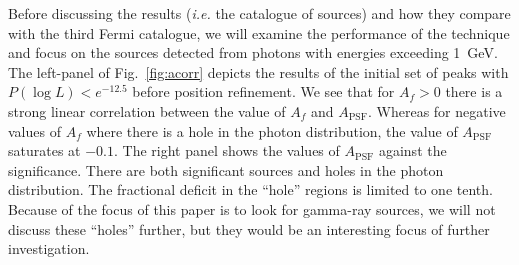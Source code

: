 \documentclass[useAMS,usenatbib]{mn2e}
\begin{document}
Before discussing the results ({\em i.e.} the catalogue of sources) and
how they compare with the third Fermi catalogue, we will examine the
performance of the technique and focus on the sources detected from
photons with energies exceeding 1~GeV.  The left-panel of
Fig.~\ref{fig:acorr} depicts the results of the initial set of peaks
with $P(\log L)<e^{-12.5}$ before position refinement.  We see that
for $A_f>0$ there is a strong linear correlation between the value of
$A_f$ and $A_\mathrm{PSF}$.  Whereas for negative values of $A_f$
where there is a hole in the photon distribution, the value of
$A_\mathrm{PSF}$ saturates at $-0.1$. The right panel shows the values
of $A_\mathrm{PSF}$ against the significance.  There are both
significant sources and holes in the photon distribution.  The
fractional deficit in the ``hole'' regions is limited to one tenth.
Because of the focus of this paper is to look for gamma-ray sources,
we will not discuss these ``holes'' further, but they would be an
interesting focus of further investigation. 
\end{document}
